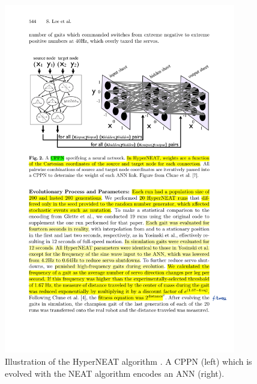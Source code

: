 \begin{figure}[htb]
    \begin{center}
        \includegraphics[width=0.9\textwidth]{cppn}
        \caption{Illustration of the HyperNEAT algorithm \cite{clune2011}.
                 A CPPN (left) which is evolved with the NEAT algorithm encodes an ANN (right).}
        \label{fig:hyperneat}
    \end{center}
\end{figure}


